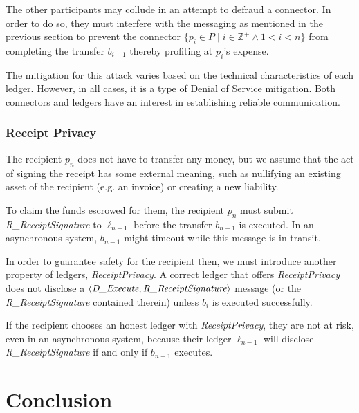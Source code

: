 \documentclass[letterpaper,twocolumn,10pt]{article}
\begin{document}
The other participants may collude in an attempt to defraud a connector. In order to do so, they must interfere with the messaging as mentioned in the previous section to prevent the connector $ \{ p_i \in P \mid i \in \mathbb{Z}^+ \land 1 < i < n \} $ from completing the transfer $b_{i-1}$ thereby profiting at $p_i$'s expense.

The mitigation for this attack varies based on the technical characteristics of each ledger. However, in all cases, it is a type of Denial of Service mitigation. Both connectors and ledgers have an interest in establishing reliable communication.


\subsubsection{Receipt Privacy}

The recipient $p_n$ does not have to transfer any money, but we assume that the act of signing the receipt has some external meaning, such as nullifying an existing asset of the recipient (e.g. an invoice) or creating a new liability.

To claim the funds escrowed for them, the recipient $p_n$ must submit \textit{R\_ReceiptSignature} to $\ell_{n-1}$ before the transfer $b_{n-1}$ is executed. In an asynchronous system, $b_{n-1}$ might timeout while this message is in transit.

In order to guarantee safety for the recipient then, we must introduce another property of ledgers, \textit{ReceiptPrivacy}. A correct ledger that offers \textit{ReceiptPrivacy} does not disclose a $\langle \textit{D\_Execute}, \textit{R\_ReceiptSignature} \rangle$ message (or the \textit{R\_ReceiptSignature} contained therein) unless $b_i$ is executed successfully.

If the recipient chooses an honest ledger with \textit{ReceiptPrivacy}, they are not at risk, even in an asynchronous system, because their ledger $\ell_{n-1}$ will disclose \textit{R\_ReceiptSignature} if and only if $b_{n-1}$ executes.


\section{Conclusion}
\end{document}
